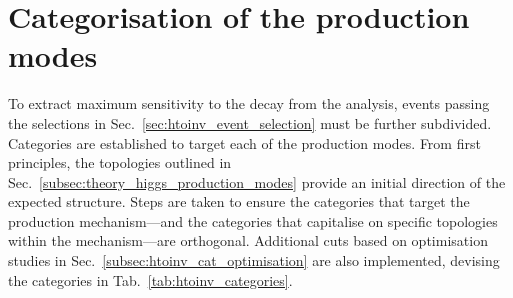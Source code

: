 \section{Categorisation of the production modes}
\label{sec:htoinv_categorisation}

To extract maximum sensitivity to the \higgstoinv decay from the analysis, events passing the selections in Sec.~\ref{sec:htoinv_event_selection} must be further subdivided. Categories are established to target each of the production modes. From first principles, the topologies outlined in Sec.~\ref{subsec:theory_higgs_production_modes} provide an initial direction of the expected structure. Steps are taken to ensure the categories that target the production mechanism---and the categories that capitalise on specific topologies within the mechanism---are orthogonal. Additional cuts based on optimisation studies in Sec.~\ref{subsec:htoinv_cat_optimisation} are also implemented, devising the categories in Tab.~\ref{tab:htoinv_categories}.

